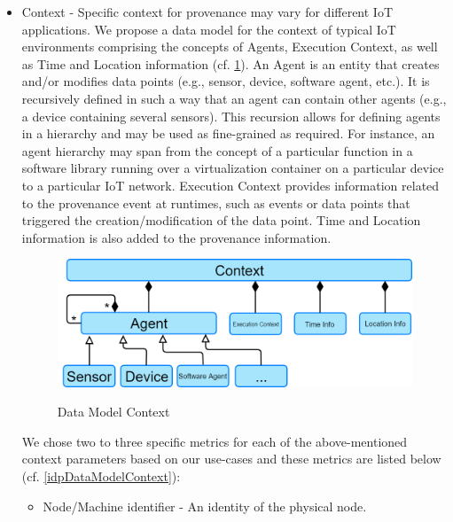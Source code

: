 \begin{itemize}
	\begin{itemize}			
			\item Example: 
\begin{lstlisting}			
[{
    "average": [   // Contribution type
        "5a81c07800031ddaf123",
        "5a81c093000a1d341fab"
    ]
}]		
\end{lstlisting}
	\end{itemize}
	\item Context - Specific context for provenance may vary for different IoT applications. We propose a data model for the context of typical IoT environments comprising the concepts of Agents, Execution Context, as well as Time and Location information (cf. \ref{dataModelContext}). An Agent is an entity that creates and/or modifies data points (e.g., sensor, device,  software agent, etc.). It is recursively defined in such a way that an agent can contain other agents (e.g., a device containing several sensors). This recursion allows for defining agents in a hierarchy and may be used as fine-grained as required. For instance, an agent hierarchy may span from the concept of a particular function in a software library running over a virtualization container on a particular device to a particular IoT network. Execution Context provides information related to the provenance event at runtimes, such as events or data points that triggered the creation/modification of the data point. Time and Location information is also added to the provenance information.
\begin{figure}[h]
\centering
\includegraphics[width=\linewidth]{figures/context.png}\\
\caption{Data Model Context}
\label{dataModelContext}
\end{figure}
We chose two to three specific metrics for each of the above-mentioned context parameters based on our use-cases and these metrics are listed below  (cf. \ref{idpDataModelContext}):
		\begin{itemize}
			\item Node/Machine  identifier - An identity of the physical node.

\end{itemize}
\end{itemize}

